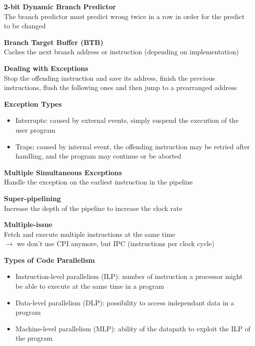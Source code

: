 \documentclass[10pt,letterpaper,landscape]{report}
\begin{document}
\begin{small}
{\begin{minipage}[t][21cm][c]{9.5cm}
    \textbf{2-bit Dynamic Branch Predictor}\\
    The branch predictor must predict wrong twice in a row in order for the predict to be changed
    
    \textbf{Branch Target Buffer (BTB)}\\
    Caches the next branch address or instruction (depending on implementation)
    
    \textbf{Dealing with Exceptions}\\
    Stop the offending instruction and save its address, finish the previous instructions, flush the following ones and then jump to a prearranged address
    
    \textbf{Exception Types}
    \begin{itemize}
        \item Interrupts: caused by external events, simply suspend the execution of the user program
        \item Traps: caused by internal event, the offending instruction may be retried after handling, and the program may continue or be aborted
    \end{itemize}
    
    \textbf{Multiple Simultaneous Exceptions}\\
    Handle the exception on the earliest instruction in the pipeline

	\textbf{Super-pipelining}\\
	Increase the depth of the pipeline to increase the clock rate
	
	\textbf{Multiple-issue}\\
	Fetch and execute multiple instructions at the same time\\
	$\rightarrow$ we don't use CPI anymore, but IPC (instructions per clock cycle)
	
	\textbf{Types of Code Parallelism}
	\begin{itemize}
	    \item Instruction-level parallelism (ILP): number of instruction a processor might be able to execute at the same time in a program
	    \item Data-level parallelism (DLP): possibility to access independant data in a program
	    \item Machine-level parallelism (MLP): ability of the datapath to exploit the ILP of the program 
	\end{itemize}
	
	
	
\end{minipage}
}


\end{small}
\end{document}
